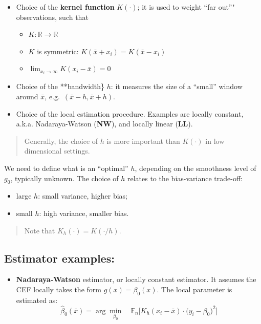 \documentclass[12pt,]{book}
\providecommand{\tightlist}{%
  \setlength{\itemsep}{0pt}\setlength{\parskip}{0pt}}
\begin{document}
\begin{itemize}
\tightlist
\item
  Choice of the \textbf{kernel function} \(K (\cdot)\); it is used to weight ``far out''" observations, such that

  \begin{itemize}
  \tightlist
  \item
    \(K: \mathbb R \to \mathbb R\)
  \item
    \(K\) is symmetric: \(K(\bar{x} + x_i) = K(\bar{x} - x_i)\)
  \item
    \(\lim_{x_i \to \infty}K(x_i - \bar{x}) = 0\)
  \end{itemize}
\item
  Choice of the **bandwidth\} \(h\): it measures the size of a ``small'' window around \(\bar{x}\), e.g.~\((\bar{x} - h, \bar{x} + h)\).
\item
  Choice of the local estimation procedure. Examples are locally constant, a.k.a. Nadaraya-Watson (\textbf{NW}), and locally linear (\textbf{LL}).
\end{itemize}

\begin{quote}
Generally, the choice of \(h\) is more important than \(K(\cdot)\) in low dimensional settings.
\end{quote}

We need to define what is an ``optimal'' \(h\), depending on the smoothness level of \(g_0\), typically unknown. The choice of \(h\) relates to the bias-variance trade-off:

\begin{itemize}
\tightlist
\item
  large \(h\): small variance, higher bias;
\item
  small \(h\): high variance, smaller bias.
\end{itemize}

\begin{quote}
Note that \(K_h (\cdot) = K (\cdot / h)\).
\end{quote}

\hypertarget{estimator-examples}{%
\subsection{Estimator examples:}\label{estimator-examples}}

\begin{itemize}
\tightlist
\item
  \textbf{Nadaraya-Watson} estimator, or locally constant estimator. It assumes the CEF locally takes the form \(g(x) = \beta_0(x)\). The local parameter is estimated as:
  \[
   \hat{\beta}_0 (\bar{x}) = \arg\min_{\beta_0}  \quad  \mathbb E_n \Big[ K_h (x_i - \bar{x}) \cdot  \big(y_i - \beta_0 \big)^2 \Big]
  \]
\end{itemize}
\end{document}
